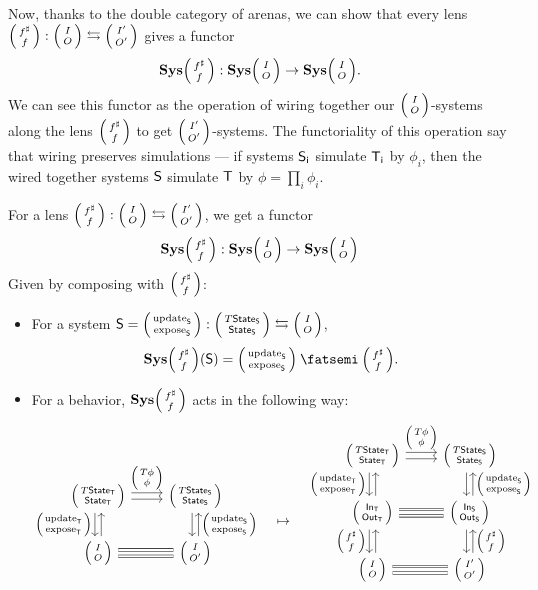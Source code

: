 \documentclass[DynamicalBook]{subfiles}
\begin{document}
Now, thanks to the double category of arenas, we can show that every lens
$\lens{f^{\sharp}}{f} : \lens{I}{O} \fromto \lens{I'}{O'}$ gives a functor 
  $$\Cat{Sys}\lens{f^\sharp}{f} : \Cat{Sys}\lens{I}{O} \to
  \Cat{Sys}\lens{I}{O}.$$
We can see this functor as the operation of wiring together our
$\lens{I}{O}$-systems along the lens $\lens{f^{\sharp}}{f}$ to get
$\lens{I'}{O'}$-systems. The functoriality of this operation say that wiring
preserves simulations --- if systems $\mathsf{S_i}$ simulate $\mathsf{T_i}$ by $\phi_i$,
then the wired together systems $\mathsf{S}$ simulate $\mathsf{T}$ by $\phi = \prod_i
\phi_i$. 

\begin{proposition}\label{prop.lens_comp_functor_discrete}
  For a lens $\lens{f^{\sharp}}{f} : \lens{I}{O} \leftrightarrows
  \lens{I'}{O'}$, we get a functor
  $$\Cat{Sys}\lens{f^\sharp}{f} : \Cat{Sys}\lens{I}{O} \to
  \Cat{Sys}\lens{I}{O}$$
  Given by composing with $\lens{f^\sharp}{f}$:
  \begin{itemize}
    \item For a system $\Sys{S} = \lens{\update{S}}{\expose{S}} :
      \lens{T\State{S}}{\State{S}}\fromto \lens{I}{O}$,
      $$\Cat{Sys}\lens{f^{\sharp}}{f}(\Sys{S}) = \lens{\update{S}}{\expose{S}} \then \lens{f^{\sharp}}{f}.$$
    \item For a behavior, $\Cat{Sys}\lens{f^{\sharp}}{f}$ acts in the following way:
      \[
  \begin{tikzcd}
    \lens{T\State{T}}{\State{T}} \ar[r, shift left, "\lens{T\phi}{\phi}"] \ar[r, shift right] \ar[d, shift right,
    "\lens{\update{T}}{\expose{T}}"'] \ar[d, shift left, leftarrow] &
    \lens{T\State{S}}{\State{S}} \ar[d, shift left, leftarrow,
    "\lens{\update{S}}{\expose{S}}"] \ar[d, shift right]\\
    \lens{I}{O} \ar[r, shift right, equals]
    \ar[r, shift left, equals] & \lens{I}{O'}
  \end{tikzcd} \quad \mapsto \quad
  \begin{tikzcd}
    \lens{T\State{T}}{\State{T}} \ar[r, shift left, "\lens{T\phi}{\phi}"] \ar[r, shift right] \ar[d, shift right,
    "\lens{\update{T}}{\expose{T}}"'] \ar[d, shift left, leftarrow] &
    \lens{T\State{S}}{\State{S}} \ar[d, shift left, leftarrow,
    "\lens{\update{S}}{\expose{S}}"] \ar[d, shift right]\\
    \lens{\In{T}}{\Out{T}} \ar[d, shift right, "\lens{f^{\sharp}}{f}"'] \ar[d, shift left,
        leftarrow] \ar[r, shift right, equals]
    \ar[r, shift left, equals] & \lens{\In{S}}{\Out{S}} \ar[d, shift left, leftarrow,
        "\lens{f^{\sharp}}{f}"] \ar[d, shift right]\\
    \lens{I}{O} \ar[r, shift right, equals]
    \ar[r, shift left, equals] & \lens{I'}{O'} \\
  \end{tikzcd} 
      \]
  \end{itemize}
\end{proposition}
\end{document}

